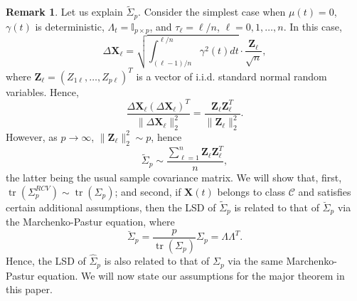 \documentclass[a4paper,11pt]{article}
\theoremstyle{plain}
\theoremstyle{definition}
\newtheorem{rmrk}[thm]{Remark}
\newcommand{\tr}{\operatorname{tr}}
\begin{document}
    \begin{rmrk}
    	Let us explain $\widetilde{\Sigma}_p$. Consider the simplest case when $\mu(t) = 0$, $\gamma(t)$ is deterministic, $\Lambda_t = \mathbb{I}_{p \times p}$, and $\tau_{\ell} = \ell / n$, $\ell = 0, 1, \dots, n$. In this case,
    	\[ \Delta \mathbf{X}_\ell = \sqrt{\int_{(\ell - 1)/n}^{\ell / n} \gamma^2(t) dt }\cdot \frac{\mathbf{Z}_\ell}{\sqrt{n}}, \]
    	where $\mathbf{Z}_\ell = (Z_{1\ell}, \dots, Z_{p\ell})^T$ is a vector of i.i.d. standard normal random variables. Hence,
    	\[ \frac{\Delta \mathbf{X}_\ell (\Delta \mathbf{X}_\ell)^T}{\| \Delta \mathbf{X}_\ell \|_2^2} = \frac{\mathbf{Z}_\ell \mathbf{Z}_\ell^T}{\|  \mathbf{Z}_\ell \|_2^2}. \]
    	However, as $p \rightarrow \infty$, $\| \mathbf{Z}_\ell \|_2^2 \sim p$, hence
    	\[ \widetilde{\Sigma}_p \sim \frac{\sum_{\ell = 1}^{n}\mathbf{Z}_\ell \mathbf{Z}_\ell^T}{n}, \]
    	the latter being the usual sample covariance matrix.
    	We will show that, first, $\tr(\Sigma_p^{RCV}) \sim \tr(\Sigma_p)$; and second, if $\mathbf{X}(t)$ belongs to class $\mathcal{C}$ and satisfies certain additional assumptions, then the LSD of $\widetilde{\Sigma}_p$ is related to that of $\breve{\Sigma}_p$ via the Marchenko-Pastur equation, where
    	\[ \breve{\Sigma}_p = \frac{p}{\tr(\Sigma_p)}\Sigma_p = \Lambda \Lambda^T. \]
    	Hence, the LSD of $\widehat{\Sigma}_p$ is also related to that of $\Sigma_p$ via the same Marchenko-Pastur equation.
    	We will now state our assumptions for the major theorem in this paper.
    \end{rmrk}
    
\end{document}
